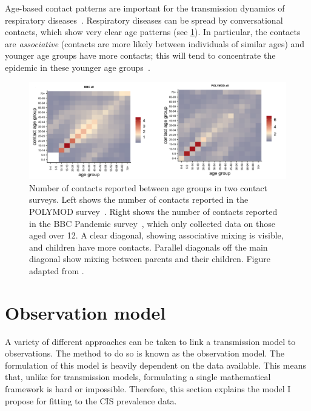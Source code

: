 \documentclass[thesis.tex]{subfiles}
\begin{document}
Age-based contact patterns are important for the transmission dynamics of respiratory diseases~\autocites{birrellBayesian}{jacksonEffects}.
Respiratory diseases can be spread by conversational contacts, which show very clear age patterns (see \cref{SEIR:fig:age-contacts}).
In particular, the contacts are \emph{associative} (contacts are more likely between individuals of similar ages) and younger age groups have more contacts; this will tend to concentrate the epidemic in these younger age groups~\autocite[67]{keelingModeling}.
\begin{figure}
  \centering \includegraphics[width=\textwidth]{SEIR/contact_matrices}
  \caption[Age-based contact matrices]{Number of contacts reported between age groups in two contact surveys. Left shows the number of contacts reported in the POLYMOD survey~\autocite{mossongSocial}. Right shows the number of contacts reported in the BBC Pandemic survey~\autocite{klepacContacts}, which only collected data on those aged over 12. A clear diagonal, showing associative mixing is visible, and children have more contacts. Parallel diagonals off the main diagonal show mixing between parents and their children. Figure adapted from \textcite{klepacContacts}.}
  \label{SEIR:fig:age-contacts}
\end{figure}





\section{Observation model} \label{SEIR:sec:observation}

A variety of different approaches can be taken to link a transmission model to observations.
The method to do so is known as the observation model.
The formulation of this model is heavily dependent on the data available.
This means that, unlike for transmission models, formulating a single mathematical framework is hard or impossible.
Therefore, this section  explains the model I propose for fitting to the CIS prevalence data.
\end{document}
